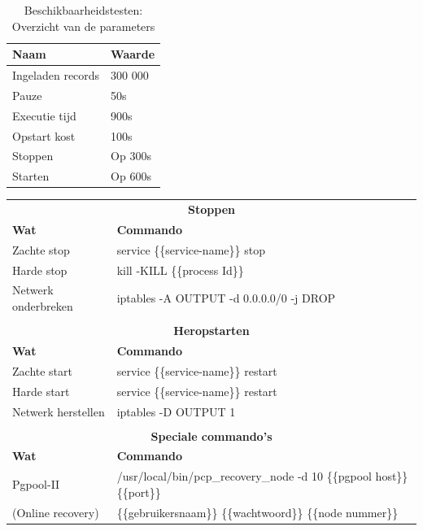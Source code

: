 \begin{table}[h!]
	\centering
	\begin{tabular}{l| l }
		\textbf{Naam} & \textbf{Waarde}  \\
		\hline
		Ingeladen records  & 300 000 \\
		Pauze & 50s \\
		Executie tijd & 900s \\
		Opstart kost & 100s \\
		Stoppen & Op 300s \\
		Starten & Op 600s \\
	\end{tabular}
	\caption{Beschikbaarheidstesten: Overzicht van de parameters}
	\label{table:beschikbaarheidstesten-parameters}
\end{table}
\begin{table}[t]
	\centering
		\begin{tabular}{l|l}
			\multicolumn{2}{c}{\textbf{Stoppen}} \\
			\textbf{Wat} & \textbf{Commando} \\ 
			\hline
			Zachte stop & service \{\{service-name\}\} stop \\ 
			Harde stop & kill -KILL \{\{process Id\}\} \\ 
			Netwerk onderbreken & iptables -A OUTPUT -d 0.0.0.0/0 -j DROP  \\ 
			\multicolumn{2}{c}{} & \\
			\multicolumn{2}{c}{\textbf{Heropstarten}} \\
			\textbf{Wat} & \textbf{Commando} \\ 
			\hline
			Zachte start & service \{\{service-name\}\} restart \\ 
			Harde start & service \{\{service-name\}\} restart \\ 
			Netwerk herstellen & iptables -D OUTPUT 1  \\ 
			\multicolumn{2}{c}{} & \\
			\multicolumn{2}{c}{\textbf{Speciale commando's}} \\
			\textbf{Wat} & \textbf{Commando} \\ 
			\hline
			Pgpool-II & /usr/local/bin/pcp\_recovery\_node -d 10 \{\{pgpool host\}\} \{\{port\}\} \\
			\hspace*{0.5cm} (Online recovery) &  \hspace*{0.5cm} \{\{gebruikersnaam\}\} \{\{wachtwoord\}\}  \{\{node nummer\}\} \\
		\end{tabular} 
	\label{table:beschikbaarheidstesten-commandos}
\end{table}

